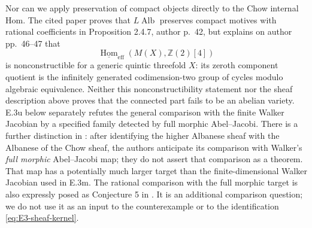 Nor can we apply preservation of compact objects directly
to the Chow internal Hom. The cited paper proves that
$L\operatorname{Alb}$ preserves compact motives with
rational coefficients in Proposition 2.4.7, author p.~42,
but explains on author pp.~46--47 that
\[
 \underline{\operatorname{Hom}}_{\mathrm{eff}}
                   (M(X),\mathbb Z(2)[4])
\]
is nonconstructible for a generic quintic threefold $X$:
its zeroth component quotient is the infinitely generated
codimension-two group of cycles modulo algebraic equivalence.
Neither this nonconstructibility statement nor the sheaf
description above proves that the connected part fails to
be an abelian variety. E.3u below separately refutes the
general comparison with the finite Walker Jacobian by a
specified family detected by full morphic Abel--Jacobi.
There is a further distinction in
\citet[Remark 3.3.6, author p.~52]{cyAyoubBarbieriViale2009}:
after identifying the higher Albanese sheaf with the
Albanese of the Chow sheaf, the authors anticipate its
comparison with Walker's \emph{full morphic} Abel--Jacobi
map; they do not assert that comparison as a theorem.
That map has a potentially much larger target than the
finite-dimensional Walker Jacobian used in E.3m.
The rational comparison with the full morphic target is
also expressly posed as Conjecture 5 in
\citet[p.~2 of the opened author report]{cyAyoub2009Report}.
It is an additional comparison question; we do not use it
as an input to the counterexample or to the identification
\eqref{eq:E3-sheaf-kernel}.
